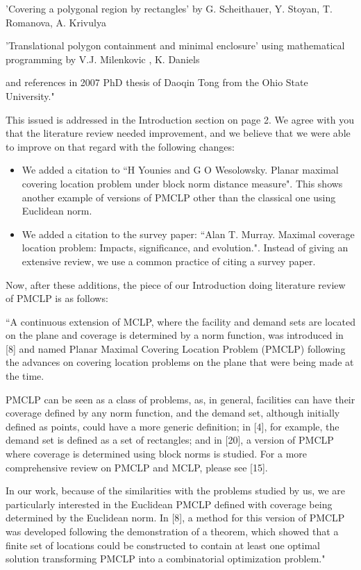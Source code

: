 		'Covering a polygonal region by rectangles' by G. Scheithauer, Y. Stoyan, T. Romanova, A. Krivulya
		
		'Translational polygon containment and minimal enclosure' using mathematical programming
		by V.J. Milenkovic , K. Daniels
		
		and references in 2007 PhD thesis of Daoqin Tong from the Ohio State University."
		
		This issued is addressed in the Introduction section on page 2. We agree with you that the literature review needed improvement, and we believe that we were able to improve on that regard with the following changes:

		\begin{itemize}
			\item We added a citation to ``H Younies and G O Wesolowsky. Planar maximal covering location problem under block norm distance measure". This shows another example of versions of PMCLP other than the classical one using Euclidean norm.
			\item We added a citation to the survey paper: ``Alan T. Murray. Maximal coverage location problem: Impacts, significance, and evolution.". Instead of giving an extensive review, we use a common practice of citing a survey paper. 
		\end{itemize}
	
	Now, after these additions, the piece of our Introduction doing literature review of PMCLP is as follows:
	
	``A continuous extension of MCLP, where the facility and demand sets are located on the plane and coverage is determined by a norm function, was introduced in [8] and named Planar Maximal	Covering Location Problem (PMCLP) following the advances on covering location problems on the	plane that were being made at the time.
	
	PMCLP can be seen as a class of problems, as, in general, facilities can have their coverage
	defined by any norm function, and the demand set, although initially defined as points, could have a more generic definition; in [4], for example, the demand set is defined as a set of rectangles; and in [20], a version of PMCLP where coverage is determined using block norms is studied. For a more comprehensive review on PMCLP and MCLP, please see [15].
	
	In our work, because of the similarities with the problems studied by us, we are particularly interested in the Euclidean PMCLP defined with coverage being determined by the Euclidean norm.	In [8], a method for this version of PMCLP was developed following the demonstration of a theorem,	which showed that a finite set of locations could be constructed to contain at least one optimal	solution transforming PMCLP into a combinatorial optimization problem."
	
